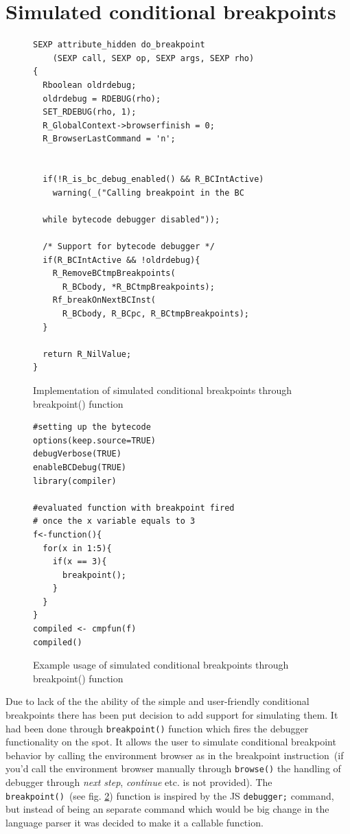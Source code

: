 \documentclass[thesis=M,english]{FITthesis}[2018/10/20]
\newcommand{\code}[1]{\texttt{#1}}
\begin{document}
{\section{Simulated conditional breakpoints}\label{conditional-breakpoints}

\begin{figure}[h]
\begin{lstlisting}
SEXP attribute_hidden do_breakpoint
	(SEXP call, SEXP op, SEXP args, SEXP rho)
{
  Rboolean oldrdebug;
  oldrdebug = RDEBUG(rho);
  SET_RDEBUG(rho, 1);
  R_GlobalContext->browserfinish = 0;
  R_BrowserLastCommand = 'n';


  if(!R_is_bc_debug_enabled() && R_BCIntActive)
    warning(_("Calling breakpoint in the BC

  while bytecode debugger disabled"));

  /* Support for bytecode debugger */
  if(R_BCIntActive && !oldrdebug){
    R_RemoveBCtmpBreakpoints(
      R_BCbody, *R_BCtmpBreakpoints);
    Rf_breakOnNextBCInst(
      R_BCbody, R_BCpc, R_BCtmpBreakpoints);
  }

  return R_NilValue;
}
\end{lstlisting}
	\caption{Implementation of simulated conditional breakpoints through breakpoint() function}\label{fig:conditional-breakpoints-breakpoint}\label{simulated-conditional-breakpoints}
\end{figure}

\begin{figure}[h]
\begin{lstlisting}
#setting up the bytecode
options(keep.source=TRUE)
debugVerbose(TRUE)
enableBCDebug(TRUE)
library(compiler)

#evaluated function with breakpoint fired
# once the x variable equals to 3
f<-function(){
  for(x in 1:5){
    if(x == 3){
      breakpoint();
    }
  }
}
compiled <- cmpfun(f)
compiled()
\end{lstlisting}
	\caption{Example usage of simulated conditional breakpoints through breakpoint() function}\label{fig:example-of-conditional-breakpoints}
\end{figure}

Due to lack of the the ability of the simple and user-friendly conditional breakpoints there has been put decision to add support for simulating them. It had been done through \code{breakpoint()} function which fires the debugger functionality on the spot. It allows the user to simulate conditional breakpoint behavior by calling the environment browser as in the breakpoint instruction~(if you'd call the environment browser manually through \code{browse()} the handling of debugger through \textit{next step}, \textit{continue} etc. is not provided). The \code{breakpoint()}~(see fig. \ref{fig:example-of-conditional-breakpoints}) function is inspired by the JS \code{debugger;} command, but instead of being an separate command which would be big change in the language parser it was decided to make it a callable function.

}
\end{document}
